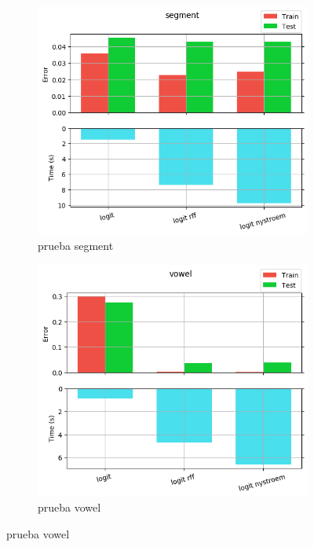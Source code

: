 \begin{figure}[ht]
  \centering
  \begin{subfigure}[b]{0.5\linewidth}
    \centering\captionsetup{width=.8\linewidth}\includegraphics[width=\imgscale\linewidth]{Figures/2_1/segment}
    \caption{prueba segment}
    \label{fig:2_1_segment}
  \end{subfigure}%
  \begin{subfigure}[b]{0.5\linewidth}
    \centering\captionsetup{width=.8\linewidth}\includegraphics[width=\imgscale\linewidth]{Figures/2_1/vowel}
    \caption{prueba vowel}
    \label{fig:2_1_vowel}
  \end{subfigure}
\end{figure}
